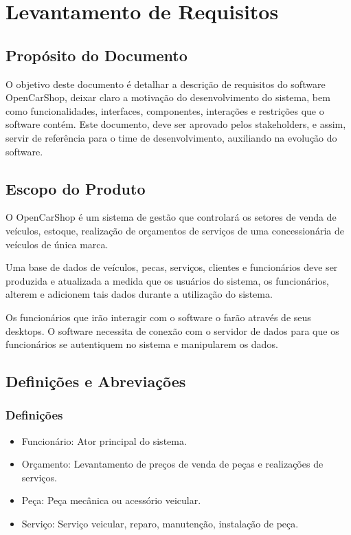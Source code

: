 \section{Levantamento de Requisitos}\label{requisitos}

\subsection{Propósito do Documento}
\par
O objetivo deste documento é detalhar a descrição de requisitos do software OpenCarShop, deixar claro a motivação do desenvolvimento do sistema, bem como funcionalidades, interfaces, componentes, interações e restrições que o software contém. Este documento, deve ser aprovado pelos stakeholders, e assim, servir de referência para o time de desenvolvimento, auxiliando na evolução do software.





\subsection{Escopo do Produto}
\par
O OpenCarShop é um sistema de gestão que controlará os setores de venda de veículos, estoque, realização de orçamentos de serviços de uma concessionária de veículos de única marca.
\par
Uma base de dados de veículos, pecas, serviços, clientes e funcionários deve ser produzida e atualizada a medida que os usuários do sistema, os funcionários, alterem e adicionem tais dados durante a utilização do sistema.
\par
Os funcionários que irão interagir com o software o farão através de seus desktops. O software necessita de conexão com o servidor de dados para que os funcionários se autentiquem no sistema e manipularem os dados. 




\subsection{Definições e Abreviações}
	\subsubsection{Definições}
	
	\begin{itemize}
		\item Funcionário: Ator principal do sistema.
		\item Orçamento: Levantamento de preços de venda de peças e realizações de serviços.
		\item Peça: Peça mecânica ou acessório veicular.
		\item Serviço: Serviço veicular, reparo, manutenção, instalação de peça.
	\end{itemize}
	
